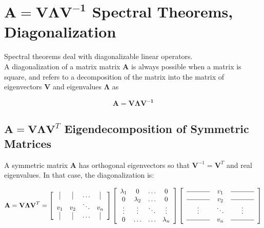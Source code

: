 \section{$\mathbf{A} = \mathbf{V\Lambda V^{-1}}$ Spectral Theorems, Diagonalization}
\label{sec:diagonalization}

Spectral theorems deal with diagonalizable linear operators. 
\\

A diagonalization of a matrix matrix $\mathbf{A}$ is always possible when a matrix is square, and refers to a decomposition of the matrix into the matrix of eigenvectors $\mathbf{V}$ and eigenvalues $\mathbf{\Lambda}$ as 

\begin{equation}
\mathbf{A} = \mathbf{V\Lambda V^{-1}} 
\end{equation}

\subsection{$\mathbf{A} = \mathbf{V\Lambda V}^T$ Eigendecomposition of Symmetric Matrices}
A symmetric matrix $\mathbf{A}$ has orthogonal eigenvectors so that $\mathbf{V}^{-1} = \mathbf{V}^T$ and real eigenvalues. In that case, the diagonalization is:

\begin{equation}
\mathbf{A} = \mathbf{V\Lambda V}^T = \left[\begin{array}{cccc}
\vrule&\vrule&\hdots&\vrule\\
v_1&v_2&\ddots&v_n\\
\vrule&\vrule&\hdots&\vrule
\end{array}\right]\left[\begin{array}{cccc}
\lambda_1&0&\hdots&0\\ 
0&\lambda_2&\hdots&0\\
\vdots&\vdots&\ddots&\vdots\\
0&\hdots&\hdots&\lambda_n
\end{array}\right]
\left[
\begin{array}{ccc}
\rule[.5ex]{3.5em}{0.4pt}&v_1&\rule[.5ex]{3.5em}{0.4pt}\\
\rule[.5ex]{3.5em}{0.4pt}&v_2&\rule[.5ex]{3.5em}{0.4pt}\\
\vdots&\ddots&\vdots\\
\rule[.5ex]{3.5em}{0.4pt}&v_n&\rule[.5ex]{3.5em}{0.4pt}\\
\end{array}
\right]
\end{equation}

